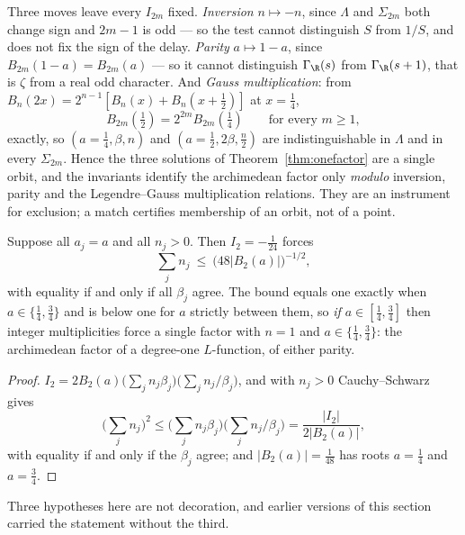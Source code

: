 \begin{remark}\label{rem:degeneracy}
Three moves leave every $I_{2m}$ fixed. \emph{Inversion} $n\mapsto-n$, since
$\Lambda$ and $\Sigma_{2m}$ both change sign and $2m-1$ is odd --- so the test
cannot distinguish $S$ from $1/S$, and does not fix the sign of the delay.
\emph{Parity} $a\mapsto1-a$, since $B_{2m}(1-a)=B_{2m}(a)$ --- so it cannot
distinguish $\Gamma_\R(s)$ from $\Gamma_\R(s+1)$, that is $\zeta$ from a real odd
character. And \emph{Gauss multiplication}: from $B_n(2x)=2^{n-1}[B_n(x)+B_n(x+\frac12)]$
at $x=\frac14$,
\[
 B_{2m}(\tfrac12)=2^{2m}B_{2m}(\tfrac14)\qquad\text{for every }m\geq1,
\]
exactly, so $(a{=}\frac14,\beta,n)$ and $(a{=}\frac12,2\beta,\frac n2)$ are
indistinguishable in $\Lambda$ and in every $\Sigma_{2m}$. Hence the three
solutions of Theorem~\ref{thm:onefactor} are a single orbit, and the invariants
identify the archimedean factor only \emph{modulo} inversion, parity and the
Legendre--Gauss multiplication relations. They are an instrument for exclusion; a
match certifies membership of an orbit, not of a point.
\end{remark}

\begin{proposition}\label{prop:rigidity}
Suppose all $a_j=a$ and all $n_j>0$. Then $I_2=-\frac1{24}$ forces
\[
 \sum_jn_j\ \leq\ \big(48|B_2(a)|\big)^{-1/2},
\]
with equality if and only if all $\beta_j$ agree. The bound equals one exactly
when $a\in\{\frac14,\frac34\}$ and is below one for $a$ strictly between them, so
\emph{if $a\in[\frac14,\frac34]$} then integer multiplicities force a single
factor with $n=1$ and $a\in\{\frac14,\frac34\}$: the archimedean factor of a
degree-one $L$-function, of either parity.
\end{proposition}

\begin{proof}
$I_2=2B_2(a)\big(\sum_jn_j\beta_j\big)\big(\sum_jn_j/\beta_j\big)$, and with
$n_j>0$ Cauchy--Schwarz gives
\[
 \Big(\sum_jn_j\Big)^2\leq\Big(\sum_jn_j\beta_j\Big)\Big(\sum_jn_j/\beta_j\Big)
 =\frac{|I_2|}{2|B_2(a)|},
\]
with equality if and only if the $\beta_j$ agree; and $|B_2(a)|=\frac1{48}$ has
roots $a=\frac14$ and $a=\frac34$.
\end{proof}

Three hypotheses here are not decoration, and earlier versions of this section
carried the statement without the third.

